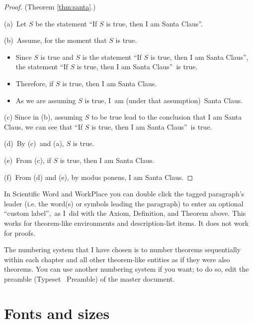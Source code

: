 \begin{proof}
(Theorem \ref{thm:santa}.)

(a)\ Let $S$ be the statement \textquotedblleft If $S$ is true, then I am
Santa Claus\textquotedblright .

(b)\ Assume, for the moment that $S$ is true.

\begin{itemize}
\item Since $S$ is true and $S$ is the statement \textquotedblleft If $S$ is
true, then I am Santa Claus\textquotedblright , the statement
\textquotedblleft If $S$ is true, then I am Santa Claus\textquotedblright\
is true.

\item Therefore, if $S$ is true, then I am Santa Claus.

\item As we are assuming $S$ is true, I\ am (under that assumption)\ Santa
Claus.
\end{itemize}

(c) Since in (b), assuming $S$ to be true lead to the conclusion that I am
Santa Claus, we can see that \textquotedblleft If $S$ is true, then I am
Santa Claus\textquotedblright\ is true.

(d)\ By (c)\ and (a), $S$ is true.

(e)\ From (c), if $S$ is true, then I am Santa Claus.

(f)\ From (d) and (e), by modus ponens, I am Santa Claus.
\end{proof}

In Scientific Word and WorkPlace you can double click the tagged paragraph's
leader (i.e. the word(s) or symbols leading the paragraph) to enter an
optional \textquotedblleft custom label\textquotedblright ,\ as I\ did with
the Axiom, Definition, and Theorem above. This works for theorem-like
environments and description-list items. It does not work for proofs.

The numbering system that I have chosen is to number theorems sequentially
within each chapter and all other theorem-like entities as if they were also
theorems. You can use another numbering system if you want; to do so, edit
the preamble (Typeset \TEXTsymbol{>}\TEXTsymbol{>}\ Preamble) of the master
document.

\section{Fonts and sizes}

